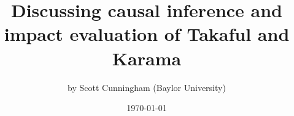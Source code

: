 \documentclass{beamer}
\begin{document}
\title{Discussing causal inference and impact evaluation of Takaful and Karama}
\author{by Scott Cunningham (Baylor University)}
\date{\today}

\maketitle









\end{document}
